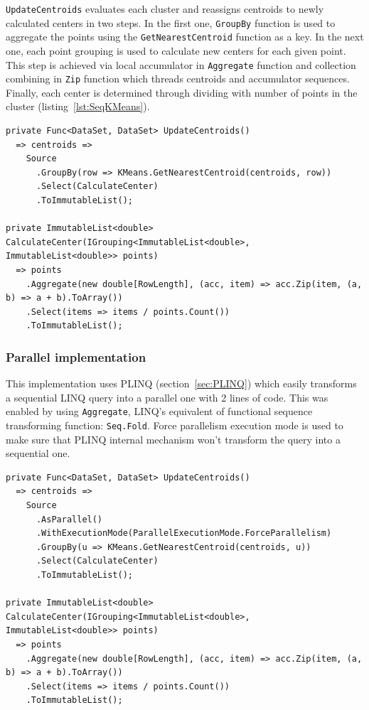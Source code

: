 \texttt{UpdateCentroids} evaluates each cluster and reassigns centroids to newly calculated centers in two steps. In the first one, \texttt{GroupBy} function is used to aggregate the points using the \texttt{GetNearestCentroid} function as a key. In the next one, each point grouping is used to calculate new centers for each given point. This step is achieved via local accumulator in \texttt{Aggregate} function and collection combining in \texttt{Zip} function which threads centroids and accumulator sequences. Finally, each center is determined through dividing with number of points in the cluster (listing~\ref{lst:SeqKMeans}).



\begin{lstlisting}[style=sharpcstyle, caption={Sequential \texttt{k-means} algorithm}, label={lst:SeqKMeans},
numbers=none, xleftmargin=0pt,framexleftmargin=0pt,framexrightmargin=0pt,framexbottommargin=0pt]
private Func<DataSet, DataSet> UpdateCentroids()
  => centroids =>
    Source
      .GroupBy(row => KMeans.GetNearestCentroid(centroids, row))
      .Select(CalculateCenter)
      .ToImmutableList();

private ImmutableList<double> CalculateCenter(IGrouping<ImmutableList<double>, ImmutableList<double>> points) 
  => points
    .Aggregate(new double[RowLength], (acc, item) => acc.Zip(item, (a, b) => a + b).ToArray())
    .Select(items => items / points.Count())
    .ToImmutableList();
\end{lstlisting}

\subsubsection{Parallel implementation}

This implementation uses PLINQ (section~\ref{sec:PLINQ}) which easily transforms a sequential LINQ query into a parallel one with 2 lines of code.
This was enabled by using \texttt{Aggregate}, LINQ's equivalent of functional sequence transforming function: \texttt{Seq.Fold}. Force parallelism execution mode is used to make sure that PLINQ internal mechanism won't transform the query into a sequential one.

\begin{lstlisting}[style=sharpcstyle, caption={Parallel \texttt{k-means} algorithm}, label={lst:ParKMeans},
numbers=none, xleftmargin=0pt,framexleftmargin=0pt,framexrightmargin=0pt,framexbottommargin=0pt]
private Func<DataSet, DataSet> UpdateCentroids()
  => centroids =>
    Source
      .AsParallel()
      .WithExecutionMode(ParallelExecutionMode.ForceParallelism)
      .GroupBy(u => KMeans.GetNearestCentroid(centroids, u))
      .Select(CalculateCenter)
      .ToImmutableList();

private ImmutableList<double> CalculateCenter(IGrouping<ImmutableList<double>, ImmutableList<double>> points)
  => points
    .Aggregate(new double[RowLength], (acc, item) => acc.Zip(item, (a, b) => a + b).ToArray())
    .Select(items => items / points.Count())
    .ToImmutableList();
\end{lstlisting}

